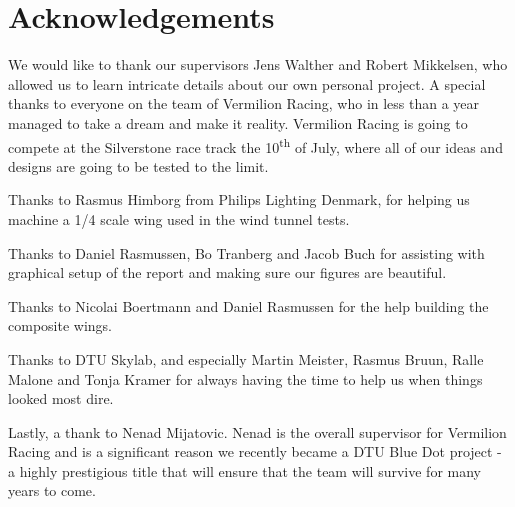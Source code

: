 \chapter*{Acknowledgements}

We would like to thank our supervisors Jens Walther and Robert Mikkelsen, who allowed us to learn intricate details about our own personal project. A special thanks to everyone on the team of Vermilion Racing, who in less than a year managed to take a dream and make it reality. Vermilion Racing is going to compete at the Silverstone race track the 10\textsuperscript{th} of July, where all of our ideas and designs are going to be tested to the limit.

Thanks to Rasmus Himborg from Philips Lighting Denmark, for helping us machine a 1/4 scale wing used in the wind tunnel tests.

Thanks to Daniel Rasmussen, Bo Tranberg and Jacob Buch for assisting with graphical setup of the report and making sure our figures are beautiful.

Thanks to Nicolai Boertmann and Daniel Rasmussen for the help building the composite wings.

Thanks to DTU Skylab, and especially Martin Meister, Rasmus Bruun, Ralle Malone and Tonja Kramer for always having the time to help us when things looked most dire.

Lastly, a thank to Nenad Mijatovic. Nenad is the overall supervisor for Vermilion Racing and is a significant reason we recently became a DTU Blue Dot project - a highly prestigious title that will ensure that the team will survive for many years to come.

\begin{figure}
  \label{fig:sponsorstack}
\end{figure}
